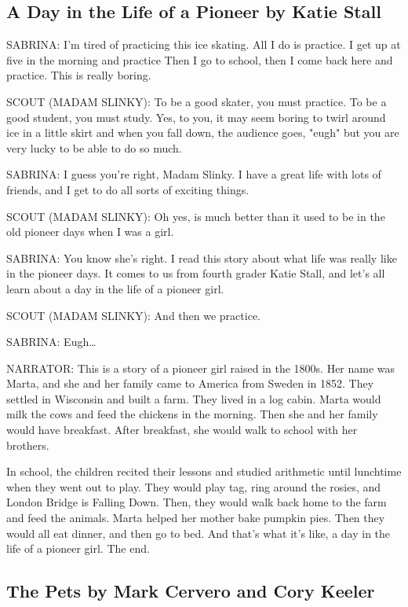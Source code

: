 \subsection{A Day in the Life of a Pioneer by Katie Stall}

SABRINA:
I'm tired of practicing this ice skating.
All I do is practice.
I get up at five in the morning and practice
Then I go to school, then I come back here and practice.
This is really boring.

SCOUT (MADAM SLINKY):
To be a good skater, you must practice.
To be a good student, you must study.
Yes, to you, it may seem boring to twirl around ice in a little skirt and when you fall down, the audience goes, "eugh" but you are very lucky to be able to do so much.

SABRINA:
I guess you're right, Madam Slinky.
I have a great life with lots of friends, and I get to do all sorts of exciting things.

SCOUT (MADAM SLINKY):
Oh yes, is much better than it used to be in the old pioneer days when I was a girl.

SABRINA:
You know she's right.
I read this story about what life was really like in the pioneer days.
It comes to us from fourth grader Katie Stall, and let's all learn about a day in the life of a pioneer girl.

SCOUT (MADAM SLINKY):
And then we practice.

SABRINA:
Eugh\dots

NARRATOR:
This is a story of a pioneer girl raised in the 1800s.
Her name was Marta, and she and her family came to America from Sweden in 1852.
They settled in Wisconsin and built a farm.
They lived in a log cabin.
Marta would milk the cows and feed the chickens in the morning.
Then she and her family would have breakfast.
After breakfast, she would walk to school with her brothers.

In school, the children recited their lessons and studied arithmetic until lunchtime when they went out to play.
They would play tag, ring around the rosies, and London Bridge is Falling Down.
Then, they would walk back home to the farm and feed the animals.
Marta helped her mother bake pumpkin pies.
Then they would all eat dinner, and then go to bed.
And that's what it's like, a day in the life of a pioneer girl.
The end.

\subsection{The Pets by Mark Cervero and Cory Keeler}

